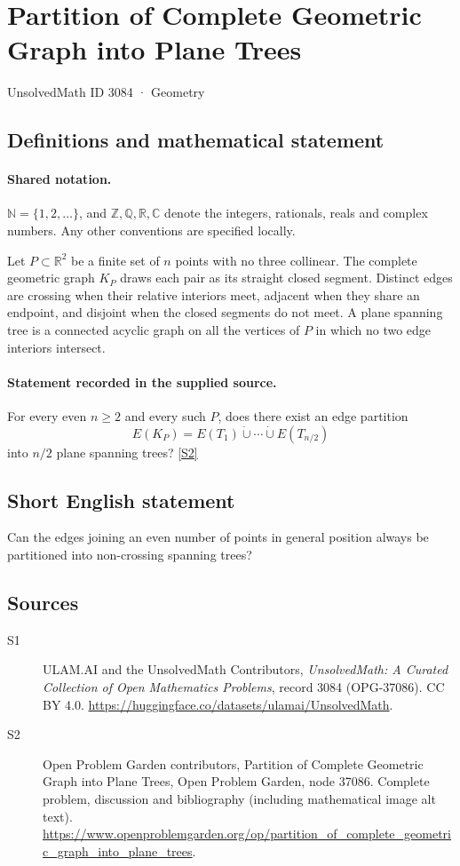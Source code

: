 \documentclass[11pt]{book}
\newcommand{\sref}[2]{\hyperlink{source:#1:#2}{[S#2]}}
\begin{document}
\setcounter{section}{3083}
\section{Partition of Complete Geometric Graph into Plane Trees}\label{3084}
{\small\sffamily UnsolvedMath ID 3084 · Geometry}
\subsection{Definitions and mathematical statement}

\paragraph{Shared notation.}$\mathbb N=\{1,2,\ldots\}$, and $\mathbb Z,\mathbb Q,\mathbb R,\mathbb C$ denote the integers, rationals, reals and complex numbers. Any other conventions are specified locally.


Let $P\subset\mathbb R^2$ be a finite set of $n$ points with no three collinear. The complete geometric graph $K_P$ draws each pair as its straight closed segment. Distinct edges are crossing when their relative interiors meet, adjacent when they share an endpoint, and disjoint when the closed segments do not meet. A plane spanning tree is a connected acyclic graph on all the vertices of $P$ in which no two edge interiors intersect.
\paragraph{Statement recorded in the supplied source.}
For every even $n\geq2$ and every such $P$, does there exist an edge partition
\[E(K_P)=E(T_1)\mathbin{\dot\cup}\cdots\mathbin{\dot\cup}E(T_{n/2})\]
into $n/2$ plane spanning trees? \sref{3084}{2}
\subsection{Short English statement}
Can the edges joining an even number of points in general position always be partitioned into non-crossing spanning trees?
\subsection{Sources}
\begin{description}
\item[\hypertarget{source:3084:1}{S1}] ULAM.AI and the UnsolvedMath Contributors, \emph{UnsolvedMath: A Curated Collection of Open Mathematics Problems}, record 3084 (OPG-37086). CC BY 4.0. \url{https://huggingface.co/datasets/ulamai/UnsolvedMath}.
\item[\hypertarget{source:3084:2}{S2}] Open Problem Garden contributors, Partition of Complete Geometric Graph into Plane Trees, Open Problem Garden, node 37086. Complete problem, discussion and bibliography (including mathematical image alt text). \url{https://www.openproblemgarden.org/op/partition_of_complete_geometric_graph_into_plane_trees}.
\end{description}
\label{end:3084}
\end{document}
